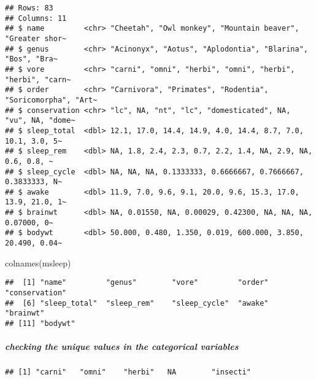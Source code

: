 \documentclass[
]{article}
\newenvironment{Shaded}{\begin{snugshade}}{\end{snugshade}}
\newcommand{\FunctionTok}[1]{\textcolor[rgb]{0.00,0.00,0.00}{#1}}
\newcommand{\NormalTok}[1]{#1}
\newcommand{\SpecialCharTok}[1]{\textcolor[rgb]{0.00,0.00,0.00}{#1}}
\begin{document}
\begin{verbatim}
## Rows: 83
## Columns: 11
## $ name         <chr> "Cheetah", "Owl monkey", "Mountain beaver", "Greater shor~
## $ genus        <chr> "Acinonyx", "Aotus", "Aplodontia", "Blarina", "Bos", "Bra~
## $ vore         <chr> "carni", "omni", "herbi", "omni", "herbi", "herbi", "carn~
## $ order        <chr> "Carnivora", "Primates", "Rodentia", "Soricomorpha", "Art~
## $ conservation <chr> "lc", NA, "nt", "lc", "domesticated", NA, "vu", NA, "dome~
## $ sleep_total  <dbl> 12.1, 17.0, 14.4, 14.9, 4.0, 14.4, 8.7, 7.0, 10.1, 3.0, 5~
## $ sleep_rem    <dbl> NA, 1.8, 2.4, 2.3, 0.7, 2.2, 1.4, NA, 2.9, NA, 0.6, 0.8, ~
## $ sleep_cycle  <dbl> NA, NA, NA, 0.1333333, 0.6666667, 0.7666667, 0.3833333, N~
## $ awake        <dbl> 11.9, 7.0, 9.6, 9.1, 20.0, 9.6, 15.3, 17.0, 13.9, 21.0, 1~
## $ brainwt      <dbl> NA, 0.01550, NA, 0.00029, 0.42300, NA, NA, NA, 0.07000, 0~
## $ bodywt       <dbl> 50.000, 0.480, 1.350, 0.019, 600.000, 3.850, 20.490, 0.04~
\end{verbatim}

\begin{Shaded}
\begin{Highlighting}[]
\FunctionTok{colnames}\NormalTok{(msleep)}
\end{Highlighting}
\end{Shaded}

\begin{verbatim}
##  [1] "name"         "genus"        "vore"         "order"        "conservation"
##  [6] "sleep_total"  "sleep_rem"    "sleep_cycle"  "awake"        "brainwt"     
## [11] "bodywt"
\end{verbatim}

\hypertarget{checking-the-unique-values-in-the-categorical-variables}{%
\subparagraph{\texorpdfstring{checking the \textbf{\emph{unique}} values
in the \textbf{\emph{categorical
variables}}}{checking the unique values in the categorical variables}}\label{checking-the-unique-values-in-the-categorical-variables}}

\begin{Shaded}
\end{Shaded}

\begin{verbatim}
## [1] "carni"   "omni"    "herbi"   NA        "insecti"
\end{verbatim}
\end{document}
